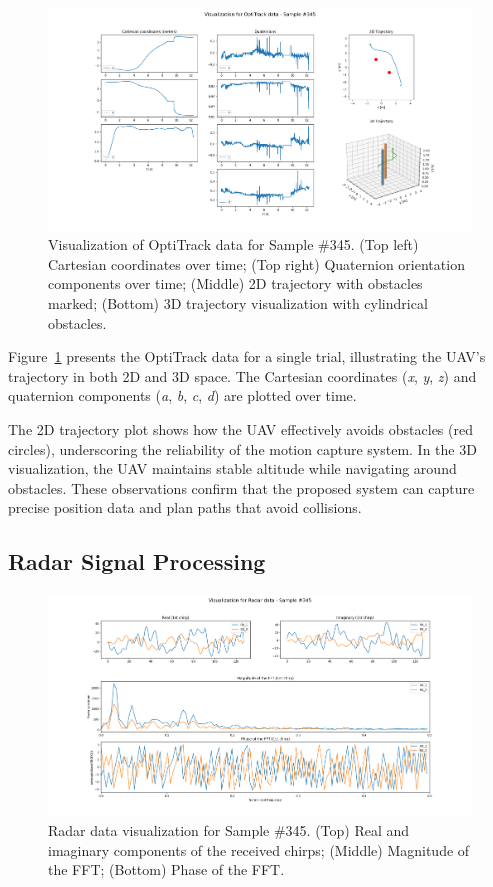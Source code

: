 \documentclass[12pt,a4paper]{article}
\begin{document}
\begin{figure}[h!]
    \centering
    \includegraphics[width=\textwidth]{OptiTrack_sample_345.png}
    \caption{Visualization of OptiTrack data for Sample \#345. (Top left) Cartesian coordinates over time; (Top right) Quaternion orientation components over time; (Middle) 2D trajectory with obstacles marked; (Bottom) 3D trajectory visualization with cylindrical obstacles.}
    \label{fig:OptiTrack}
\end{figure}

Figure~\ref{fig:OptiTrack} presents the OptiTrack data for a single trial, illustrating the UAV's trajectory in both 2D and 3D space. The Cartesian coordinates (\textit{x}, \textit{y}, \textit{z}) and quaternion components (\textit{a}, \textit{b}, \textit{c}, \textit{d}) are plotted over time. 

The 2D trajectory plot shows how the UAV effectively avoids obstacles (red circles), underscoring the reliability of the motion capture system. In the 3D visualization, the UAV maintains stable altitude while navigating around obstacles. These observations confirm that the proposed system can capture precise position data and plan paths that avoid collisions.

\subsection{Radar Signal Processing}

\begin{figure}[h!]
    \centering
    \includegraphics[width=\textwidth]{Radar_sample_345.png}
    \caption{Radar data visualization for Sample \#345. (Top) Real and imaginary components of the received chirps; (Middle) Magnitude of the FFT; (Bottom) Phase of the FFT.}
    \label{fig:Radar}
\end{figure}
\end{document}
